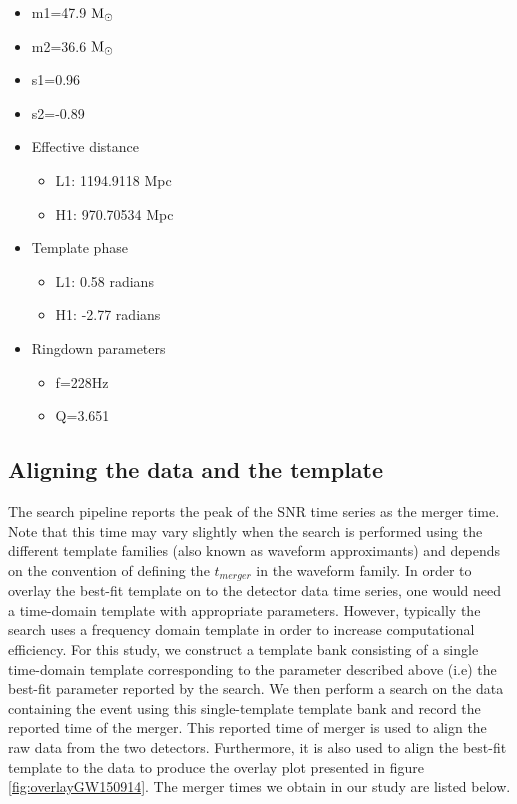 \begin{itemize}
\item m1=47.9 $\mathrm{M}_\odot$
\item m2=36.6 $\mathrm{M}_\odot$
\item s1=0.96
\item  s2=-0.89
\item Effective distance
	\begin{itemize}
	\item L1: 1194.9118 Mpc 
	\item H1: 970.70534 Mpc
	\end{itemize}
    
\item Template phase
	\begin{itemize}
	\item L1: 0.58 radians
	\item H1: -2.77 radians
	\end{itemize}
\item Ringdown parameters
	\begin{itemize}
	\item f=228Hz
	\item Q=3.651
	\end{itemize}

\end{itemize}

\subsection{Aligning the data and the template}

The search pipeline reports the peak of the SNR time series as the merger time. Note that this time may vary slightly when the search is performed using the different template families (also known as waveform approximants) and depends on the convention of defining the $t_{merger}$ in the waveform family. In order to overlay the best-fit template on to the detector data time series, one would need a time-domain template with appropriate parameters. However, typically the search uses a frequency domain template in order to increase computational efficiency. For this study, we construct a template bank consisting of a single time-domain template corresponding to the parameter described above (i.e) the best-fit parameter reported by the search. We then perform a search on the data containing the event using this single-template template bank and record the reported time of the merger. This reported time of merger is used to align the raw data from the two detectors. Furthermore, it is also used to align the best-fit template to the data to produce the overlay plot presented in figure \ref{fig:overlayGW150914}. The merger times we obtain in our study are listed below. 

